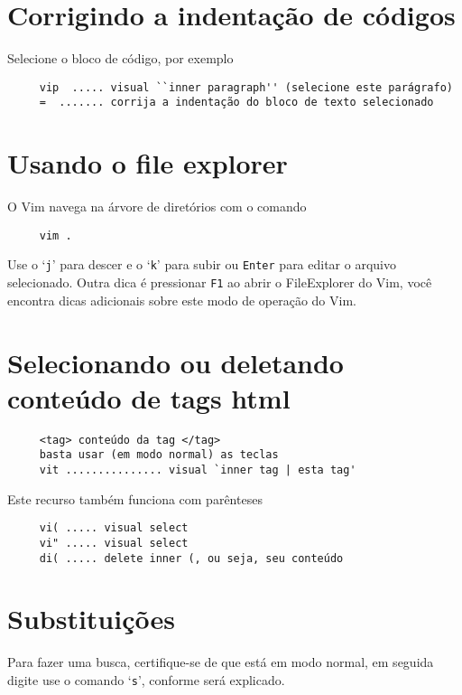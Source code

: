 \section{Corrigindo a indentação de códigos}
\label{Corrigindo a indentação de códigos}
Selecione o bloco de código, por exemplo

\begin{verbatim}
     vip  ..... visual ``inner paragraph'' (selecione este parágrafo)
     =  ....... corrija a indentação do bloco de texto selecionado
\end{verbatim}

\section{Usando o file explorer}
\label{Usando o file explorer}
O Vim navega na árvore de diretórios com o comando

\begin{verbatim}
     vim .
\end{verbatim}

Use o `{\tt j}' para descer e o `{\tt k}' para subir ou {\tt Enter} para editar o
arquivo selecionado. Outra dica é pressionar {\tt F1} ao abrir o
FileExplorer do Vim, você encontra dicas adicionais sobre este modo de
operação do Vim.

\section{Selecionando ou deletando conteúdo de tags html}
\label{Selecionando ou deletando conteúdo de tags html}

\begin{verbatim}
     <tag> conteúdo da tag </tag>
     basta usar (em modo normal) as teclas
     vit ............... visual `inner tag | esta tag'
\end{verbatim}

Este recurso também funciona com parênteses

\begin{verbatim}
     vi( ..... visual select
     vi" ..... visual select
     di( ..... delete inner (, ou seja, seu conteúdo
\end{verbatim}


\section{Substituições }
\label{Substituições }

Para fazer uma busca, certifique-se de que está em modo normal, em
seguida digite use o comando `{\tt s}', conforme será explicado.

